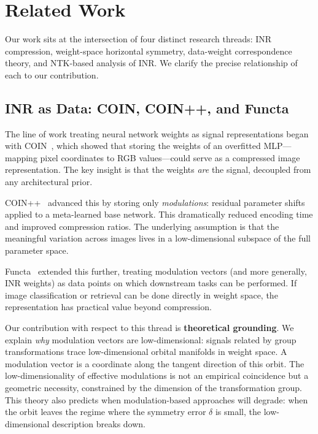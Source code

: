 \section{Related Work}
\label{sec:related}

Our work sits at the intersection of four distinct research threads: INR compression, weight-space horizontal symmetry, data-weight correspondence theory, and NTK-based analysis of INR.
We clarify the precise relationship of each to our contribution.

\subsection{INR as Data: COIN, COIN++, and Functa}

The line of work treating neural network weights as signal representations began with COIN~\citep{chen2022coin}, which showed that storing the weights of an overfitted MLP---mapping pixel coordinates to RGB values---could serve as a compressed image representation.
The key insight is that the weights \emph{are} the signal, decoupled from any architectural prior.

COIN++~\citep{dupont2022coinpp} advanced this by storing only \emph{modulations}: residual parameter shifts applied to a meta-learned base network.
This dramatically reduced encoding time and improved compression ratios.
The underlying assumption is that the meaningful variation across images lives in a low-dimensional subspace of the full parameter space.

Functa~\citep{dupont2022functa} extended this further, treating modulation vectors (and more generally, INR weights) as data points on which downstream tasks can be performed.
If image classification or retrieval can be done directly in weight space, the representation has practical value beyond compression.

Our contribution with respect to this thread is \textbf{theoretical grounding}.
We explain \emph{why} modulation vectors are low-dimensional: signals related by group transformations trace low-dimensional orbital manifolds in weight space.
A modulation vector is a coordinate along the tangent direction of this orbit.
The low-dimensionality of effective modulations is not an empirical coincidence but a geometric necessity, constrained by the dimension of the transformation group.
This theory also predicts when modulation-based approaches will degrade: when the orbit leaves the regime where the symmetry error $\delta$ is small, the low-dimensional description breaks down.

